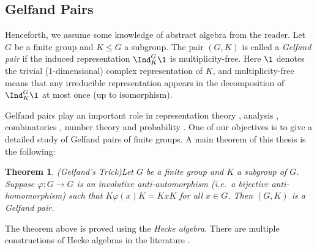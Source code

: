 \documentclass[11pt]{amsart}
\newtheorem{thm}{Theorem}
\theoremstyle{remark}
\begin{document}

\subsection*{Gelfand Pairs}
Henceforth, we assume some knowledge of abstract algebra from the reader.
Let $G$ be a finite group and $K\leq G$ a subgroup.
The pair $(G,K)$ is called a \emph{Gelfand pair} if the induced representation $\Ind_K^G \1$ is multiplicity-free.
Here $\1$ denotes the trivial ($1$-dimensional) complex representation of $K$, and multiplicity-free means that any irreducible representation appears in the decomposition of $\Ind_K^G \1$ at most once (up to isomorphism).

Gelfand pairs play an important role in representation theory \cites{Musili93}, analysis \cites{Koranyi80,Morel18}, combinatorics \cite{Bannai84}, number theory \cites{Gross91, Terras99} and probability \cites{CSST20, Diaconis88}.
One of our objectives is to give a detailed study of Gelfand pairs of finite groups.
A main theorem of this thesis is the following:
\begin{thm}(Gelfand's Trick)\label{theorem: Gelfands_Trick_intro}
	Let $G$ be a finite group and $K$ a subgroup of $G$.
	Suppose $\varphi\colon G\to G$ is an involutive anti-automorphism (i.e.\ a bijective anti-homomorphism) such that $K\varphi(x)K=KxK$ for all $x\in G$.
	Then $(G,K)$ is a Gelfand pair.
\end{thm}
The theorem above is proved using the \emph{Hecke algebra}.
There are multiple constructions of Hecke algebras in the  literature \cites{CMHL03,CSST20}.

\end{document}
